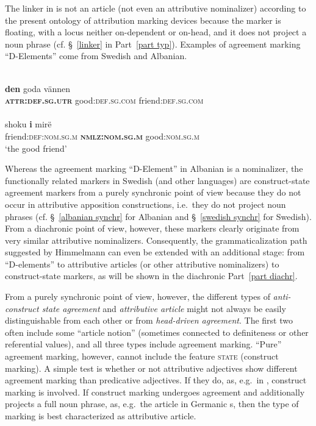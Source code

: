 The linker in  is not an article (not even an attributive nominalizer) according to the present ontology of attribution marking devices because the marker is floating, with a locus neither on-dependent or on-head, and it does not project a noun phrase (cf. \S~\ref{linker} in Part~\ref{part typ}). Examples of agreement marking “D-Elements” come from Swedish and Albanian.
\begin{exe}
\ex
\begin{xlist}
\ex 
{}\\
\gll	\textbf{den} goda vännen\\
	\textbf{\textsc{attr:def.sg.utr}} good:\textsc{def.sg.com} friend:\textsc{def.sg.com}\\
\ex 
{}\\
\gll	shoku \textbf{i} mirë\\
	friend:\textsc{def:nom.sg.m} \textbf{\textsc{nmlz:nom.sg.m}} good:\textsc{nom.sg.m}\\
\glt	‘the good friend’
\end{xlist}
\end{exe}
Whereas the agreement marking “D-Element” in Albanian is a nominalizer, the functionally related markers in Swedish (and other languages) are construct-state agreement markers from a purely synchronic point of view because they do not occur in attributive apposition constructions, i.e.~they do not project noun phrases (cf. \S~\ref{albanian synchr} for Albanian and \S~\ref{swedish synchr} for Swedish). From a diachronic point of view, however, these markers clearly originate from very similar attributive nominalizers. Consequently, the grammaticalization path suggested by Himmelmann \citeyear{himmelmann1997} can even be extended with an additional stage: from “D-elements” to attributive articles (or other attributive nominalizers) to construct-state markers, as will be shown in the diachronic Part~\ref{part diachr}.

From a purely synchronic point of view, however, the different types of \emph{anti\hyp{}construct state agreement} and \emph{attributive article} might not always be easily distinguishable from each other or from \emph{head\hyp{}driven agreement}. The first two often include some “article notion” (sometimes connected to definiteness or other referential values), and all three types include agreement marking. “Pure” agreement marking, however, cannot include the feature \textsc{state} (construct marking). A simple test is whether or not attributive adjectives show different agreement marking than predicative adjectives. If they do, as, e.g.~in , construct marking is involved. If construct marking undergoes agreement and additionally projects a full noun phrase, as, e.g.~the article in Germanic s, then the type of marking is best characterized as attributive article.

